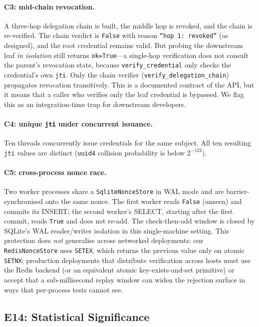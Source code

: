 \documentclass[10pt,twocolumn]{IEEEtran}
\begin{document}
\paragraph{C3: mid-chain revocation.} A three-hop delegation chain
is built, the middle hop is revoked, and the chain is re-verified.
The chain verdict is \texttt{False} with reason
\texttt{``hop 1: revoked''} (as designed), and the root credential
remains valid. But probing the downstream leaf \emph{in isolation}
still returns \texttt{ok=True}---a single-hop verification does not
consult the parent's revocation state, because
\texttt{verify\_credential} only checks the credential's own
\texttt{jti}. Only the chain verifier (\texttt{verify\_delegation\_chain})
propagates revocation transitively. This is a documented contract
of the API, but it means that a caller who verifies only the leaf
credential is bypassed. We flag this as an integration-time trap
for downstream developers.

\paragraph{C4: unique \texttt{jti} under concurrent issuance.} Ten
threads concurrently issue credentials for the same subject. All ten
resulting \texttt{jti} values are distinct (\texttt{uuid4} collision
probability is below $2^{-122}$).

\paragraph{C5: cross-process nonce race.} Two worker processes share
a \texttt{SqliteNonceStore} in WAL mode and are barrier-synchronised
onto the same nonce. The first worker reads \texttt{False} (unseen)
and commits its INSERT; the second worker's SELECT, starting after
the first commit, reads \texttt{True} and does not re-add. The
check-then-add window is closed by SQLite's WAL reader/writer
isolation in this single-machine setting. This protection does
\emph{not} generalise across networked deployments: our
\texttt{RedisNonceStore} uses \texttt{SETEX}, which returns the
previous value only on atomic \texttt{SETNX}; production
deployments that distribute verification across hosts must use the
Redis backend (or an equivalent atomic key-exists-and-set primitive)
or accept that a sub-millisecond replay window can widen the
rejection surface in ways that per-process tests cannot see.

\subsection{E14: Statistical Significance}
\end{document}
